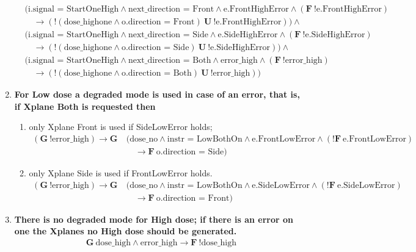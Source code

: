 \documentclass[a4paper,10pt]{article}
\newcommand{\LTLG}{\mathbf{G~}}
\newcommand{\LTLF}{\mathbf{F~}}
\newcommand{\LTLU}{\mathbf{~U~}}
\newcommand{\imply}{\rightarrow}
\newcommand{\doseno}{\textrm{dose\_no}}
\newcommand{\dosehigh}{\textrm{dose\_high}}
\newcommand{\dosehighone}{\textrm{dose\_highone}}
\newcommand{\errorhigh}{\textrm{error\_high}}
\begin{document}
\begin{enumerate}
\begin{align*}
				& (\textrm{i.signal = StartOneHigh} \land \textrm{next\_direction = Front} \land \textrm{e.FrontHighError} \land (\LTLF !\textrm{e.FrontHighError}) \\
				&\hspace{1em}	\imply (!(\dosehighone \land \textrm{o.direction = Front}) \LTLU !\textrm{e.FrontHighError})) \land \\
				& (\textrm{i.signal = StartOneHigh} \land \textrm{next\_direction = Side} \land \textrm{e.SideHighError} \land (\LTLF !\textrm{e.SideHighError}) \\
				&\hspace{1em}	\imply (!(\dosehighone \land \textrm{o.direction = Side}) \LTLU !\textrm{e.SideHighError})) \land \\
				& (\textrm{i.signal = StartOneHigh} \land \textrm{next\_direction = Both} \land \errorhigh \land (\LTLF !\errorhigh) \\
				&\hspace{1em}	\imply (!(\dosehighone \land \textrm{o.direction = Both}) \LTLU !\errorhigh))
			\end{align*}
		\item \textbf{For Low dose a degraded mode is used in case of an error, that is, if Xplane Both is requested then}
			\begin{enumerate}
				\item only Xplane Front is used if SideLowError holds;
					\begin{align*}
						(\LTLG !\errorhigh) \imply \LTLG &(\doseno \land \textrm{instr = LowBothOn} \land \textrm{e.FrontLowError} \land (!\LTLF \textrm{e.FrontLowError}) \\
						&\hspace{1em}	\imply \LTLF \textrm{o.direction = Side})
					\end{align*}
				\item only Xplane Side is used if FrontLowError holds.
					\begin{align*}
						(\LTLG !\errorhigh) \imply \LTLG &(\doseno \land \textrm{instr = LowBothOn} \land \textrm{e.SideLowError} \land (!\LTLF \textrm{e.SideLowError}) \\
						&\hspace{1em}	\imply \LTLF \textrm{o.direction = Front})
					\end{align*}
			\end{enumerate}

		\item \textbf{There is no degraded mode for High dose; if there is an error on one the Xplanes no High dose should be generated.}
			\begin{align*}
				\LTLG \dosehigh \land \errorhigh \imply \LTLF !\dosehigh
			\end{align*}


\end{enumerate}
\end{document}
